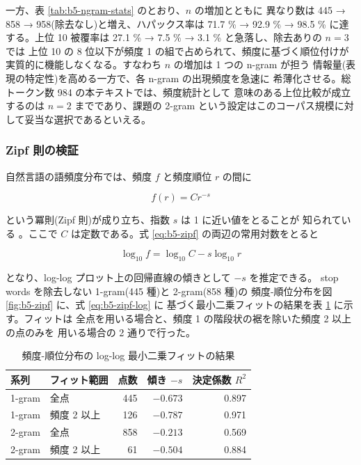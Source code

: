 一方、表 \ref{tab:b5-ngram-stats} のとおり、$n$ の増加とともに
異なり数は 445 → 858 → 958(除去なし)と増え、ハパックス率は
71.7 \% → 92.9 \% → 98.5 \% に達する。上位 10 被覆率は
27.1 \% → 7.5 \% → 3.1 \% と急落し、除去ありの $n = 3$ では
上位 10 の 8 位以下が頻度 1 の組で占められて、頻度に基づく順位付けが
実質的に機能しなくなる。すなわち $n$ の増加は 1 つの n-gram が担う
情報量(表現の特定性)を高める一方で、各 n-gram の出現頻度を急速に
希薄化させる。総トークン数 984 の本テキストでは、頻度統計として
意味のある上位比較が成立するのは $n = 2$ までであり、課題の 2-gram
という設定はこのコーパス規模に対して妥当な選択であるといえる。

\subsubsection{Zipf 則の検証}

自然言語の語頻度分布では、頻度 $f$ と頻度順位 $r$ の間に

\begin{equation}\label{eq:b5-zipf}
f(r) = C r^{-s}
\end{equation}

という冪則(Zipf 則)が成り立ち、指数 $s$ は 1 に近い値をとることが
知られている \cite{b5-stanisz}。ここで $C$ は定数である。式
\ref{eq:b5-zipf} の両辺の常用対数をとると

\begin{equation}\label{eq:b5-zipf-log}
\log_{10} f = \log_{10} C - s \log_{10} r
\end{equation}

となり、log-log プロット上の回帰直線の傾きとして $-s$ を推定できる。
stop words を除去しない 1-gram(445 種)と 2-gram(858 種)の
頻度-順位分布を図 \ref{fig:b5-zipf} に、式 \ref{eq:b5-zipf-log} に
基づく最小二乗フィットの結果を表 \ref{tab:b5-zipf} に示す。フィットは
全点を用いる場合と、頻度 1 の階段状の裾を除いた頻度 2 以上の点のみを
用いる場合の 2 通りで行った。

\begin{table}[htbp]
\centering
\caption{頻度-順位分布の log-log 最小二乗フィットの結果}
\label{tab:b5-zipf}
\begin{tabular}{llrrr}
\hline
系列 & フィット範囲 & 点数 & 傾き $-s$ & 決定係数 $R^2$ \\
\hline
1-gram & 全点 & 445 & $-0.673$ & 0.897 \\
1-gram & 頻度 2 以上 & 126 & $-0.787$ & 0.971 \\
2-gram & 全点 & 858 & $-0.213$ & 0.569 \\
2-gram & 頻度 2 以上 & 61 & $-0.504$ & 0.884 \\
\hline
\end{tabular}
\end{table}

